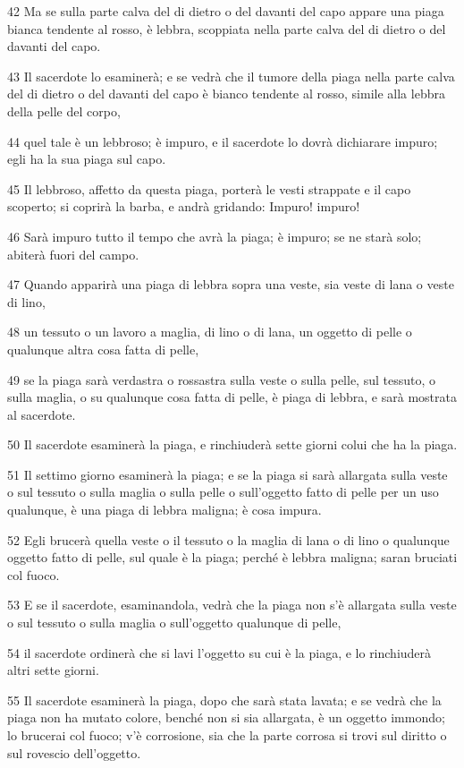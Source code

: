\par 42 Ma se sulla parte calva del di dietro o del davanti del capo appare una piaga bianca tendente al rosso, è lebbra, scoppiata nella parte calva del di dietro o del davanti del capo.
\par 43 Il sacerdote lo esaminerà; e se vedrà che il tumore della piaga nella parte calva del di dietro o del davanti del capo è bianco tendente al rosso, simile alla lebbra della pelle del corpo,
\par 44 quel tale è un lebbroso; è impuro, e il sacerdote lo dovrà dichiarare impuro; egli ha la sua piaga sul capo.
\par 45 Il lebbroso, affetto da questa piaga, porterà le vesti strappate e il capo scoperto; si coprirà la barba, e andrà gridando: Impuro! impuro!
\par 46 Sarà impuro tutto il tempo che avrà la piaga; è impuro; se ne starà solo; abiterà fuori del campo.
\par 47 Quando apparirà una piaga di lebbra sopra una veste, sia veste di lana o veste di lino,
\par 48 un tessuto o un lavoro a maglia, di lino o di lana, un oggetto di pelle o qualunque altra cosa fatta di pelle,
\par 49 se la piaga sarà verdastra o rossastra sulla veste o sulla pelle, sul tessuto, o sulla maglia, o su qualunque cosa fatta di pelle, è piaga di lebbra, e sarà mostrata al sacerdote.
\par 50 Il sacerdote esaminerà la piaga, e rinchiuderà sette giorni colui che ha la piaga.
\par 51 Il settimo giorno esaminerà la piaga; e se la piaga si sarà allargata sulla veste o sul tessuto o sulla maglia o sulla pelle o sull'oggetto fatto di pelle per un uso qualunque, è una piaga di lebbra maligna; è cosa impura.
\par 52 Egli brucerà quella veste o il tessuto o la maglia di lana o di lino o qualunque oggetto fatto di pelle, sul quale è la piaga; perché è lebbra maligna; saran bruciati col fuoco.
\par 53 E se il sacerdote, esaminandola, vedrà che la piaga non s'è allargata sulla veste o sul tessuto o sulla maglia o sull'oggetto qualunque di pelle,
\par 54 il sacerdote ordinerà che si lavi l'oggetto su cui è la piaga, e lo rinchiuderà altri sette giorni.
\par 55 Il sacerdote esaminerà la piaga, dopo che sarà stata lavata; e se vedrà che la piaga non ha mutato colore, benché non si sia allargata, è un oggetto immondo; lo brucerai col fuoco; v'è corrosione, sia che la parte corrosa si trovi sul diritto o sul rovescio dell'oggetto.
